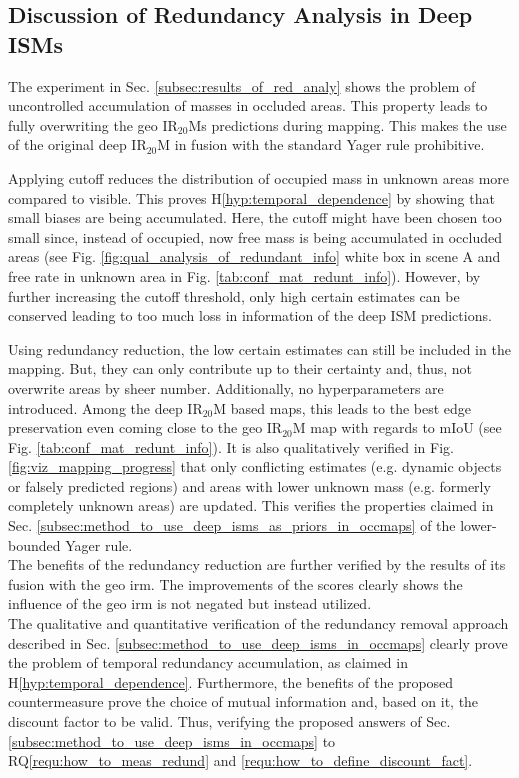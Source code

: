 \subsection{Discussion of Redundancy Analysis in Deep ISMs}
\label{subsec:discussion_of_red_analy}
The experiment in Sec. \ref{subsec:results_of_red_analy} shows the problem of uncontrolled accumulation of masses in occluded areas. This property leads to fully overwriting the geo IR$_{20}$Ms predictions during mapping. This makes the use of the original deep IR$_{20}$M in fusion with the standard Yager rule prohibitive. 

Applying cutoff reduces the distribution of occupied mass in unknown areas more compared to visible. This proves H\ref{hyp:temporal_dependence} by showing that small biases are being accumulated. Here, the cutoff might have been chosen too small since, instead of occupied, now free mass is being accumulated in occluded areas (see Fig. \ref{fig:qual_analysis_of_redundant_info} white box in scene A and free rate in unknown area in Fig. \ref{tab:conf_mat_redunt_info}). However, by further increasing the cutoff threshold, only high certain estimates can be conserved leading to too much loss in information of the deep ISM predictions. 

Using redundancy reduction, the low certain estimates can still be included in the mapping. But, they can only contribute up to their certainty and, thus, not overwrite areas by sheer number. Additionally, no hyperparameters are introduced. Among the deep IR$_{20}$M based maps, this leads to the best edge preservation even coming close to the geo IR$_{20}$M map with regards to mIoU (see Fig. \ref{tab:conf_mat_redunt_info}). It is also qualitatively verified in Fig. \ref{fig:viz_mapping_progress} that only conflicting estimates (e.g. dynamic objects or falsely predicted regions) and areas with lower unknown mass (e.g. formerly completely unknown areas) are updated. This verifies the properties claimed in Sec. \ref{subsec:method_to_use_deep_isms_as_priors_in_occmaps} of the lower-bounded Yager rule.\\
The benefits of the redundancy reduction are further verified by the results of its fusion with the geo \gls{irm}. The improvements of the scores clearly shows the influence of the geo \gls{irm} is not negated but instead utilized.\\
The qualitative and quantitative verification of the redundancy removal approach described in Sec. \ref{subsec:method_to_use_deep_isms_in_occmaps} clearly prove the problem of temporal redundancy accumulation, as claimed in H\ref{hyp:temporal_dependence}. Furthermore, the benefits of the proposed countermeasure prove the choice of mutual information and, based on it, the discount factor to be valid. Thus, verifying the proposed answers of Sec. \ref{subsec:method_to_use_deep_isms_in_occmaps} to RQ\ref{requ:how_to_meas_redund} and \ref{requ:how_to_define_discount_fact}.

